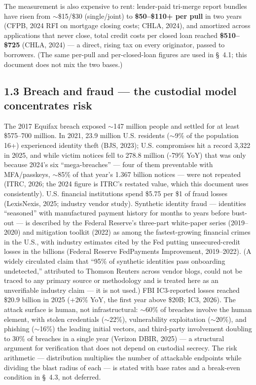 \documentclass[
]{article}
\begin{document}
The measurement is also expensive to rent: lender-paid tri-merge report
bundles have risen from \(\sim\)\$15/\$30 (single/joint) to
\textbf{\$50--\$110+ per pull} in two years (CFPB, 2024 RFI on mortgage
closing costs; CHLA, 2024), and amortized across applications that never
close, total credit costs per closed loan reached \textbf{\$510--\$725}
(CHLA, 2024) --- a direct, rising tax on every originator, passed to
borrowers. (The same per-pull and per-closed-loan figures are used in
§~4.1; this document does not mix the two bases.)

\subsection{1.3 Breach and fraud --- the custodial model concentrates
risk}\label{breach-and-fraud-the-custodial-model-concentrates-risk}

The 2017 Equifax breach exposed \(\sim\)147 million people and settled
for at least \$575--700 million. In 2021, 23.9 million U.S. residents
(\(\sim\)9\% of the population 16+) experienced identity theft (BJS,
2023); U.S. compromises hit a record 3,322 in 2025, and while victim
notices fell to 278.8 million (-79\% YoY) that was only because 2024's
six ``mega-breaches'' --- four of them preventable with MFA/passkeys,
\(\sim\)85\% of that year's 1.367 billion notices --- were not repeated
(ITRC, 2026; the 2024 figure is ITRC's restated value, which this
document uses consistently). U.S. financial institutions spend \$5.75
per \$1 of fraud losses (LexisNexis, 2025; industry vendor study).
Synthetic identity fraud --- identities ``seasoned'' with manufactured
payment history for months to years before bust-out --- is described by
the Federal Reserve's three-part white-paper series (2019--2020) and
mitigation toolkit (2022) as among the fastest-growing financial crimes
in the U.S., with industry estimates cited by the Fed putting
unsecured-credit losses in the billions (Federal Reserve FedPayments
Improvement, 2019--2022). (A widely circulated claim that ``95\% of
synthetic identities pass onboarding undetected,'' attributed to Thomson
Reuters across vendor blogs, could not be traced to any primary source
or methodology and is treated here as an unverifiable industry claim ---
it is not used.) FBI IC3-reported losses reached \$20.9 billion in 2025
(+26\% YoY, the first year above \$20B; IC3, 2026). The attack surface
is human, not infrastructural: \(\sim\)60\% of breaches involve the
human element, with stolen credentials (\(\sim\)22\%), vulnerability
exploitation (\(\sim\)20\%), and phishing (\(\sim\)16\%) the leading
initial vectors, and third-party involvement doubling to 30\% of
breaches in a single year (Verizon DBIR, 2025) --- a structural argument
for verification that does not depend on custodial secrecy. The risk
arithmetic --- distribution multiplies the number of attackable
endpoints while dividing the blast radius of each --- is stated with
base rates and a break-even condition in §~4.3, not deferred.
\end{document}

